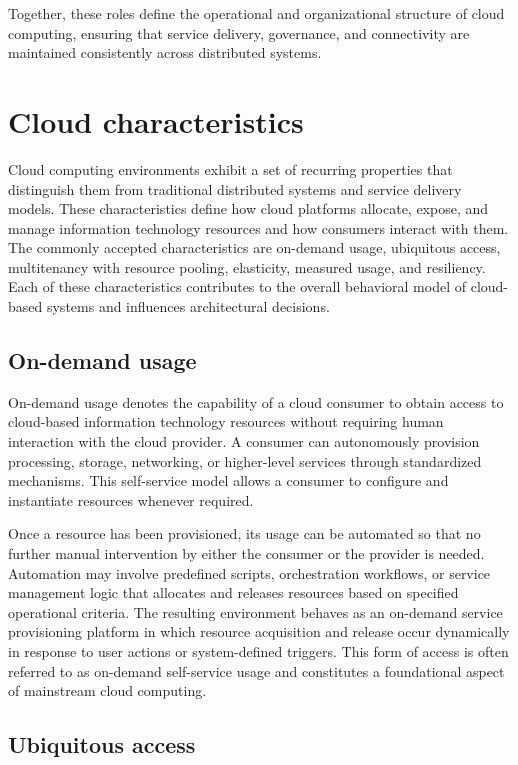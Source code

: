 \documentclass[11pt,a4paper,openany]{report}
\begin{document}
Together, these roles define the operational and organizational structure of cloud computing, ensuring that service delivery, governance, and connectivity are maintained consistently across distributed systems.

\section{Cloud characteristics}

Cloud computing environments exhibit a set of recurring properties that distinguish them from traditional distributed systems and service delivery models. These characteristics define how cloud platforms allocate, expose, and manage information technology resources and how consumers interact with them. The commonly accepted characteristics are on-demand usage, ubiquitous access, multitenancy with resource pooling, elasticity, measured usage, and resiliency. Each of these characteristics contributes to the overall behavioral model of cloud-based systems and influences architectural decisions.

\subsection{On-demand usage}

On-demand usage denotes the capability of a cloud consumer to obtain access to cloud-based information technology resources without requiring human interaction with the cloud provider. A consumer can autonomously provision processing, storage, networking, or higher-level services through standardized mechanisms. This self-service model allows a consumer to configure and instantiate resources whenever required.

Once a resource has been provisioned, its usage can be automated so that no further manual intervention by either the consumer or the provider is needed. Automation may involve predefined scripts, orchestration workflows, or service management logic that allocates and releases resources based on specified operational criteria. The resulting environment behaves as an on-demand service provisioning platform in which resource acquisition and release occur dynamically in response to user actions or system-defined triggers. This form of access is often referred to as on-demand self-service usage and constitutes a foundational aspect of mainstream cloud computing.

\subsection{Ubiquitous access}
\end{document}
